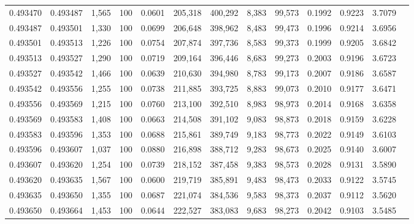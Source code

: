 \begin{tabular}{rrrrrrrrrrrrr}
0.493470 & 0.493487 & 1,565 & 100 &                                     0.0601 & 205,318 & 400,292 &   8,383 &  99,573 & 0.1992 & 0.9223 & 3.7079 \\
0.493487 & 0.493501 & 1,330 & 100 &                                     0.0699 & 206,648 & 398,962 &   8,483 &  99,473 & 0.1996 & 0.9214 & 3.6956 \\
0.493501 & 0.493513 & 1,226 & 100 &                                     0.0754 & 207,874 & 397,736 &   8,583 &  99,373 & 0.1999 & 0.9205 & 3.6842 \\
0.493513 & 0.493527 & 1,290 & 100 &                                     0.0719 & 209,164 & 396,446 &   8,683 &  99,273 & 0.2003 & 0.9196 & 3.6723 \\
0.493527 & 0.493542 & 1,466 & 100 &                                     0.0639 & 210,630 & 394,980 &   8,783 &  99,173 & 0.2007 & 0.9186 & 3.6587 \\
0.493542 & 0.493556 & 1,255 & 100 &                                     0.0738 & 211,885 & 393,725 &   8,883 &  99,073 & 0.2010 & 0.9177 & 3.6471 \\
0.493556 & 0.493569 & 1,215 & 100 &                                     0.0760 & 213,100 & 392,510 &   8,983 &  98,973 & 0.2014 & 0.9168 & 3.6358 \\
0.493569 & 0.493583 & 1,408 & 100 &                                     0.0663 & 214,508 & 391,102 &   9,083 &  98,873 & 0.2018 & 0.9159 & 3.6228 \\
0.493583 & 0.493596 & 1,353 & 100 &                                     0.0688 & 215,861 & 389,749 &   9,183 &  98,773 & 0.2022 & 0.9149 & 3.6103 \\
0.493596 & 0.493607 & 1,037 & 100 &                                     0.0880 & 216,898 & 388,712 &   9,283 &  98,673 & 0.2025 & 0.9140 & 3.6007 \\
0.493607 & 0.493620 & 1,254 & 100 &                                     0.0739 & 218,152 & 387,458 &   9,383 &  98,573 & 0.2028 & 0.9131 & 3.5890 \\
0.493620 & 0.493635 & 1,567 & 100 &                                     0.0600 & 219,719 & 385,891 &   9,483 &  98,473 & 0.2033 & 0.9122 & 3.5745 \\
0.493635 & 0.493650 & 1,355 & 100 &                                     0.0687 & 221,074 & 384,536 &   9,583 &  98,373 & 0.2037 & 0.9112 & 3.5620 \\
0.493650 & 0.493664 & 1,453 & 100 &                                     0.0644 & 222,527 & 383,083 &   9,683 &  98,273 & 0.2042 & 0.9103 & 3.5485 \\

\end{tabular}
